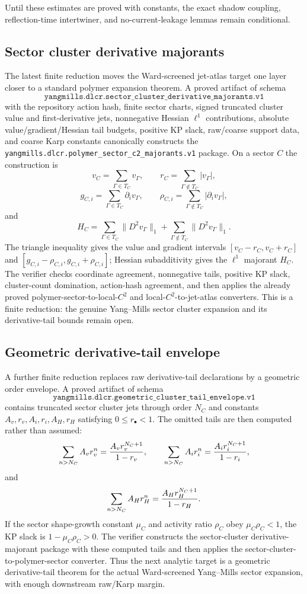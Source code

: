 Until these estimates are proved with constants, the exact shadow coupling,
reflection-time intertwiner, and no-current-leakage lemmas remain conditional.

\subsection{Sector cluster derivative majorants}
The latest finite reduction moves the Ward-screened jet-atlas target one layer
closer to a standard polymer expansion theorem. A proved artifact of schema
\[
  \texttt{yangmills.dlcr.sector\_cluster\_derivative\_majorants.v1}
\]
with the repository action hash, finite sector charts, signed truncated cluster
value and first-derivative jets, nonnegative Hessian $\ell^1$ contributions,
absolute value/gradient/Hessian tail budgets, positive KP slack, raw/coarse
support data, and coarse Karp constants canonically constructs the
\texttt{yangmills.dlcr.polymer\_sector\_c2\_majorants.v1} package.
On a sector $C$ the construction is
\[
 v_C=\sum_{\Gamma\in T_C}v_\Gamma,\qquad
 r_C=\sum_{\Gamma\notin T_C}|v_\Gamma|,
\]
\[
 g_{C,i}=\sum_{\Gamma\in T_C}\partial_i v_\Gamma,\qquad
 \rho_{C,i}=\sum_{\Gamma\notin T_C}|\partial_i v_\Gamma|,
\]
and
\[
 H_C=\sum_{\Gamma\in T_C}\|D^2v_\Gamma\|_1+
     \sum_{\Gamma\notin T_C}\|D^2v_\Gamma\|_1 .
\]
The triangle inequality gives the value and gradient intervals
$[v_C-r_C,v_C+r_C]$ and $[g_{C,i}-\rho_{C,i},g_{C,i}+\rho_{C,i}]$; Hessian
subadditivity gives the $\ell^1$ majorant $H_C$. The verifier checks coordinate
agreement, nonnegative tails, positive KP slack, cluster-count domination,
action-hash agreement, and then applies the already proved
polymer-sector-to-local-$C^2$ and local-$C^2$-to-jet-atlas converters. This is a
finite reduction: the genuine Yang--Mills sector cluster expansion and its
derivative-tail bounds remain open.

\subsection{Geometric derivative-tail envelope}
A further finite reduction replaces raw derivative-tail declarations by a
geometric order envelope. A proved artifact of schema
\[
  \texttt{yangmills.dlcr.geometric\_cluster\_tail\_envelope.v1}
\]
contains truncated sector cluster jets through order $N_C$ and constants
$A_v,r_v,A_i,r_i,A_H,r_H$ satisfying $0\le r_\bullet<1$. The omitted tails are
then computed rather than assumed:
\[
 \sum_{n>N_C} A_v r_v^n={A_v r_v^{N_C+1}\over 1-r_v},\qquad
 \sum_{n>N_C} A_i r_i^n={A_i r_i^{N_C+1}\over 1-r_i},
\]
and
\[
 \sum_{n>N_C} A_H r_H^n={A_H r_H^{N_C+1}\over 1-r_H}.
\]
If the sector shape-growth constant $\mu_C$ and activity ratio $\rho_C$ obey
$\mu_C\rho_C<1$, the KP slack is $1-\mu_C\rho_C>0$. The verifier constructs the
sector-cluster derivative-majorant package with these computed tails and then
applies the sector-cluster-to-polymer-sector converter. Thus the next analytic
target is a geometric derivative-tail theorem for the actual Ward-screened
Yang--Mills sector expansion, with enough downstream raw/Karp margin.

